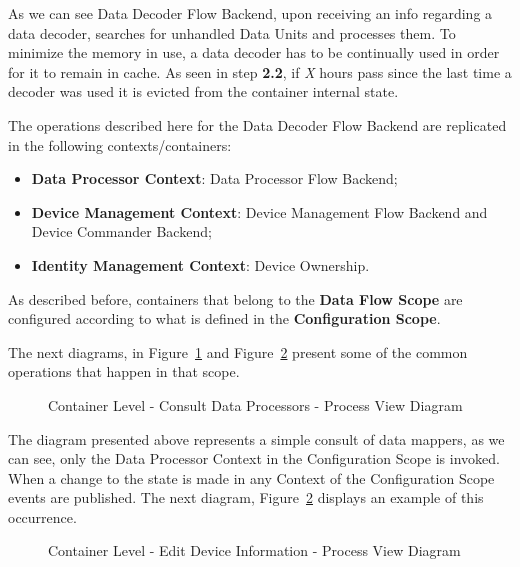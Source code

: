 As we can see Data Decoder Flow Backend, upon receiving an info regarding a data decoder, searches for unhandled Data Units and processes them.
To minimize the memory in use, a data decoder has to be continually used in order for it to remain in cache. As seen in step \textbf{2.2}, if \textit{X} hours pass since the last time a decoder was used it is evicted from the container internal state.

The operations described here for the Data Decoder Flow Backend are replicated in the following contexts/containers:

\begin{itemize}
   \item \textbf{Data Processor Context}: Data Processor Flow Backend;
   \item \textbf{Device Management Context}: Device Management Flow Backend and Device Commander Backend;
   \item \textbf{Identity Management Context}: Device Ownership.
\end{itemize}

As described before, containers that belong to the \textbf{Data Flow Scope} are configured according to what is defined in the \textbf{Configuration Scope}.

The next diagrams, in Figure~\ref{fig:design:architecture:container:process:diagram:processor} and Figure~\ref{fig:design:architecture:container:process:diagram:device} present some of the common operations that happen in that scope.

\begin{figure}[H]
   \centering
   \resizebox{\columnwidth}{!}
   {      
      
   }
   \caption[Container Level - Consult Data Processors - Process View Diagram]{Container Level - Consult Data Processors - Process View Diagram}
   \label{fig:design:architecture:container:process:diagram:processor}
\end{figure}

The diagram presented above represents a simple consult of data mappers, as we can see, only the Data Processor Context in the Configuration Scope is invoked. When a change to the state is made in any Context of the Configuration Scope events are published. The next diagram, Figure~\ref{fig:design:architecture:container:process:diagram:device} displays an example of this occurrence.

\begin{figure}[H]
   \centering
   \resizebox{\columnwidth}{!}
   {      
      
   }
   \caption[Container Level - Edit Device Information - Process View Diagram]{Container Level - Edit Device Information - Process View Diagram}
   \label{fig:design:architecture:container:process:diagram:device}
\end{figure}

